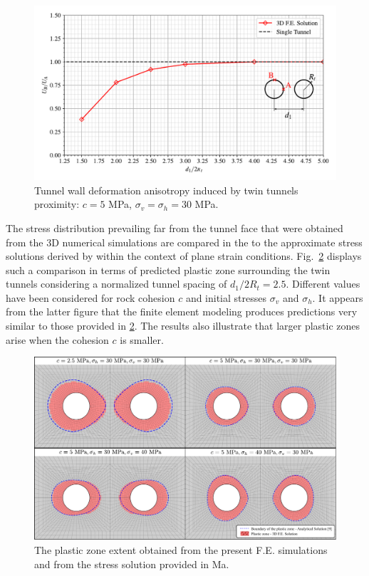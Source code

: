 \documentclass[Journal,letterpaper, NoLists,SectionNumbers]{ascelike-new}
\begin{document}
\begin{figure}[h!]
	\centering
	\includegraphics[scale=0.65]{MA_Relationship between Convergence in B and A.pdf}
	\caption{Tunnel wall deformation anisotropy induced by twin tunnels proximity: $c=5$ MPa, $\sigma_v = \sigma_h = 30$ MPa.}
	\label{MA_Relationship between convergence in B and A}
\end{figure}

The stress distribution prevailing far from the tunnel face that were obtained from the 3D numerical simulations are compared in the to the approximate stress solutions derived by  within the context of plane strain conditions. Fig.~\ref{MA_FIG1} displays such a comparison in terms of predicted plastic zone surrounding the twin tunnels considering a normalized tunnel spacing of $d_1/2R_t = 2.5$.  Different values have been considered for rock cohesion $c$ and initial stresses $\sigma_v$ and $\sigma_h$. It appears from the latter figure that the finite element modeling produces predictions very similar to those provided in \ref{MA_FIG1}. The results also illustrate that larger plastic zones arise when the cohesion $c$ is smaller.

\begin{figure}[h!]
	\centering
	\includegraphics[scale=0.7]{MA_Comparisions_plastic_zones.pdf}
	\caption{The plastic zone extent obtained from the present F.E. simulations and from the stress solution provided in Ma.}
	\label{MA_FIG1}
\end{figure}
\end{document}
